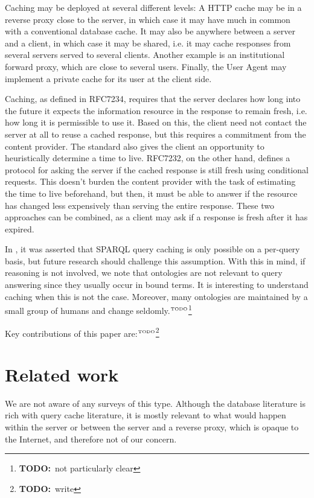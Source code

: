 \documentclass{llncs}
\newcommand{\todo}[1]{\ensuremath{^{\textrm{\tiny{TODO}\normalsize}}}\footnote{\textbf{TODO:}~#1}}
\begin{document}
Caching may be deployed at several different levels: A HTTP cache may
be in a reverse proxy close to the server, in which case it may have
much in common with a conventional database cache. It may also be
anywhere between a server and a client, in which case it may be
shared, i.e. it may cache responses from several servers served to
several clients. Another example is an institutional forward proxy,
which are close to several users. Finally, the User Agent may
implement a private cache for its user at the client side.

Caching, as defined in RFC7234, requires that the server declares how
long into the future it expects the information resource in the
response to remain fresh, i.e. how long it is permissible to use
it. Based on this, the client need not contact the server at all to
reuse a cached response, but this requires a commitment from the
content provider. The standard also gives the client an opportunity to
heuristically determine a time to live. RFC7232, on the other hand,
defines a protocol for asking the server if the cached response is
still fresh using conditional requests. This doesn't burden the
content provider with the task of estimating the time to live
beforehand, but then, it must be able to answer if the resource has
changed less expensively than serving the entire response. These two
approaches can be combined, as a client may ask if a response is fresh
after it has expired.

In \cite{ldf1}, it was asserted that SPARQL query caching is only
possible on a per-query basis, but future research should challenge
this assumption. With this in mind, if reasoning is not involved, we
note that ontologies are not relevant to query answering since they
usually occur in bound terms. It is interesting to understand caching
when this is not the case. Moreover, many ontologies are maintained by
a small group of humans and change seldomly.\todo{not particularly clear}

Key contributions of this paper are:\todo{write}

\section{Related work}

We are not aware of any surveys of this type. Although the database
literature is rich with query cache literature, it is mostly relevant
to what would happen within the server or between the server and a
reverse proxy, which is opaque to the Internet, and therefore not of
our concern.
\end{document}

